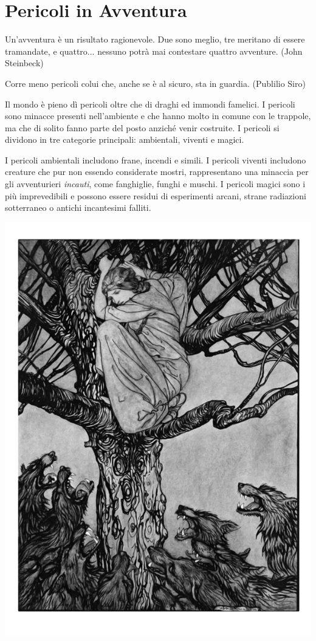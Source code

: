 \section{Pericoli in Avventura}

\begin{enfasi}{
Un'avventura è un risultato ragionevole. Due sono meglio, tre meritano di essere tramandate, e quattro... nessuno potrà mai contestare quattro avventure. (John Steinbeck)

\medskip

Corre meno pericoli colui che, anche se è al sicuro, sta in guardia. (Publilio Siro)} \end{enfasi}

\label{pericoli-in-avventura}

\begin{multicols}{2}

Il mondo è pieno dì pericoli oltre che di draghi ed immondi famelici. I pericoli sono minacce presenti nell'ambiente e che hanno molto in comune con le trappole, ma che di solito fanno parte del posto anziché venir costruite. I pericoli si dividono in tre categorie principali: ambientali, viventi e magici.

I pericoli ambientali includono frane, incendi e simili. I pericoli viventi includono creature che pur non essendo considerate mostri, rappresentano una minaccia per gli avventurieri \emph{incauti}, come fanghiglie, funghi e muschi. I pericoli magici sono i più imprevedibili e possono essere residui di esperimenti arcani, strane radiazioni sotterraneo o antichi incantesimi falliti.

\medskip

\begin{center}
\includegraphics[width=0.75\linewidth]{immagini/boscopericoli.png}
\end{center}


\end{multicols}
